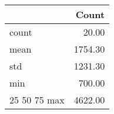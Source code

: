 \begin{tabular}{lr}
\toprule
 & Count \\
\midrule
count & 20.00 \\
mean & 1754.30 \\
std & 1231.30 \\
min & 700.00 \\
25%
50%
75%
max & 4622.00 \\
\bottomrule
\end{tabular}
